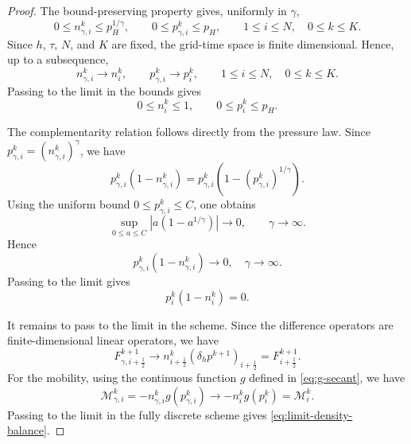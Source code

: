 \documentclass[11pt]{article}
\theoremstyle{plain}
\numberwithin{equation}{section}
\begin{document}
\begin{proof}
The bound-preserving property gives, uniformly in \(\gamma\),
\[
    0\le n_{\gamma,i}^{k}\le p_H^{1/\gamma},
    \qquad
    0\le p_{\gamma,i}^{k}\le p_H,
    \qquad 1\le i\le N,\quad 0\le k\le K .
\]
Since \(h\), \(\tau\), \(N\), and \(K\) are fixed, the grid-time space is
finite dimensional. Hence, up to a subsequence,
\[
    n_{\gamma,i}^{k}\to n_i^k,
    \qquad
    p_{\gamma,i}^{k}\to p_i^k,
    \qquad 1\le i\le N,\quad 0\le k\le K .
\]
Passing to the limit in the bounds gives
\[
    0\le n_i^k\le1,
    \qquad
    0\le p_i^k\le p_H .
\]


The complementarity relation follows directly from the pressure law. Since
\(p_{\gamma,i}^k=(n_{\gamma,i}^k)^\gamma\), we have
\[
p_{\gamma,i}^k(1-n_{\gamma,i}^k)
=
p_{\gamma,i}^k\left(1-(p_{\gamma,i}^k)^{1/\gamma}\right).
\]
Using the uniform bound \(0\le p_{\gamma,i}^k\le C\), one obtains
\[
\sup_{0\le a\le C}\left|a(1-a^{1/\gamma})\right|\to0,
\qquad \gamma\to\infty.
\]
Hence
\[
p_{\gamma,i}^k(1-n_{\gamma,i}^k)\to0, \quad \gamma\to\infty. 
\]
Passing to the limit gives
\[
p_i^k(1-n_i^k)=0.
\]

It remains to pass to the limit in the scheme. Since the difference
operators are finite-dimensional linear operators, we have
\[
    F_{\gamma,i+\frac12}^{k+1}
    \to
    n_{i+\frac12}^{k}
    (\delta_h p^{k+1})_{i+\frac12}
    =
    F_{i+\frac12}^{k+1}.
\]
For the mobility, using the continuous function \(g\) defined in
\eqref{eq:g-secant}, we have
\[
    \mathcal M_{\gamma,i}^k
    =
    -n_{\gamma,i}^k g(p_{\gamma,i}^k)
    \to
    -n_i^k g(p_i^k)
    =
    \mathcal M_i^k .
\]
Passing to the limit in the fully discrete scheme gives
\eqref{eq:limit-density-balance}. 
\end{proof}
\end{document}
